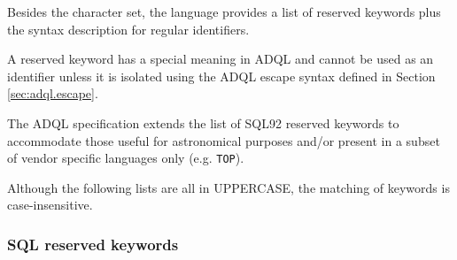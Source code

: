 \documentclass[11pt,a4paper]{ivoa}
\newcommand{\SectionRef}[1]{Section \ref{#1}\xspace}
\begin{document}
Besides the character set, the language provides a list of reserved keywords
plus the syntax description for regular identifiers.

A reserved keyword has a special meaning in ADQL and cannot be used as
an identifier unless it is isolated using the ADQL escape syntax defined
in \SectionRef{sec:adql.escape}.

The ADQL specification extends the list of SQL92 reserved keywords to accommodate
those useful for astronomical purposes and/or present in a subset of vendor
specific languages only (e.g. \verb:TOP:).

Although the following lists are all in UPPERCASE, the matching of keywords
is case-insensitive.

\subsubsection{SQL reserved keywords}
\label{sec:adql.keywords}
\end{document}
